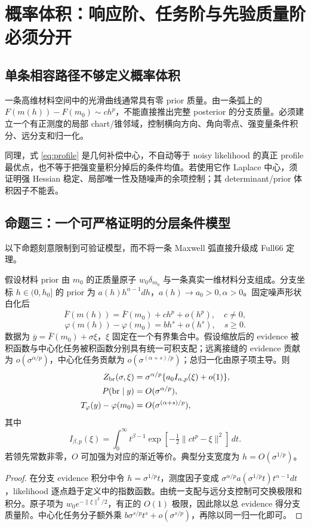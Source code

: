 \section{概率体积：响应阶、任务阶与先验质量阶必须分开}
\label{sec:volume}

\subsection{单条相容路径不够定义概率体积}
一条高维材料空间中的光滑曲线通常具有零 prior 质量。由一条弧上的 $F(m(h))-F(m_0)\sim ch^p$，不能直接推出完整 posterior 的分支质量。必须建立一个有正测度的局部 chart/锥邻域，控制横向方向、角向零点、强变量条件积分、远分支和归一化。

同理，式 \eqref{eq:profile} 是几何补偿中心，不自动等于 noisy likelihood 的真正 profile 最优点，也不等于把强变量积分掉后的条件均值。若使用它作 Laplace 中心，须证明强 Hessian 稳定、局部唯一性及随噪声的余项控制；其 determinant/prior 体积因子不能丢。

\subsection{命题三：一个可严格证明的分层条件模型}
以下命题刻意限制到可验证模型，而不将一条 Maxwell 弧直接升级成 Full66 定理。

\begin{theorem}[任务分辨的接缝质量尺度]
\label{thm:scaling}
假设材料 prior 由 $m_0$ 的正质量原子 $w_0\delta_{m_0}$ 与一条真实一维材料分支组成。分支坐标 $h\in(0,h_0]$ 的 prior 为
$a(h)h^{\alpha-1}dh$，$a(h)\to a_0>0,\alpha>0$。固定噪声形状白化后
\[
\bar F(m(h))=\bar F(m_0)+c h^p+o(h^p),\quad c\ne0,
\]
\[
\varphi(m(h))-\varphi(m_0)=b h^s+o(h^s),\quad s\ge0.
\]
数据为 $\bar y=\bar F(m_0)+\sigma\xi$，$\xi$ 固定在一个有界集合中。假设缩放后的 evidence 被积函数与中心化任务被积函数分别具有统一可积支配；远离接缝的 evidence 贡献为 $o(\sigma^{\alpha/p})$，中心化任务贡献为 $o(\sigma^{(\alpha+s)/p})$；总归一化由原子项主导。则
\begin{align}
Z_{\rm br}(\sigma,\xi)
&=\sigma^{\alpha/p}\{a_0 I_{\alpha,p}(\xi)+o(1)\},\\
P({\rm br}\mid y)&=O(\sigma^{\alpha/p}),\\
T_\varphi(y)-\varphi(m_0)&=O(\sigma^{(\alpha+s)/p}),
\label{eq:three-exponents}
\end{align}
其中
\[
I_{\beta,p}(\xi)=
\int_0^\infty t^{\beta-1}
\exp[-\tfrac12\|ct^p-\xi\|^2]\,dt.
\]
若领先常数非零，$O$ 可加强为对应的渐近等价。典型分支宽度为 $h=O(\sigma^{1/p})$。
\end{theorem}
\begin{proof}
在分支 evidence 积分中令 $h=\sigma^{1/p}t$，测度因子变成
$\sigma^{\alpha/p}a(\sigma^{1/p}t)t^{\alpha-1}dt$，likelihood 逐点趋于定义中的指数函数。由统一支配与远分支控制可交换极限和积分。原子项为
$w_0e^{-\|\xi\|^2/2}$，有正的 $O(1)$ 极限，因此除以总 evidence 得分支质量阶。中心化任务分子额外乘 $b\sigma^{s/p}t^s+o(\sigma^{s/p})$，再除以同一归一化即可。
\end{proof}

